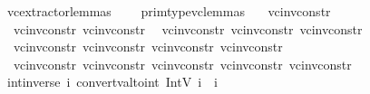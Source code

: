 \begin{isabellebody}
\isanewline
{}\isamarkupfalse%
\ vc{\isacharunderscore}{\kern0pt}extractor{\isacharunderscore}{\kern0pt}lemmas\ {\isacharequal}{\kern0pt}\ \isanewline
\ \ prim{\isacharunderscore}{\kern0pt}type{\isacharunderscore}{\kern0pt}vc{\isacharunderscore}{\kern0pt}lemmas\ \isanewline
\ \ vc{\isacharunderscore}{\kern0pt}inv{\isacharunderscore}{\kern0pt}constr{\isacharunderscore}{\kern0pt}{}{}\ \ \isanewline
\ \ vc{\isacharunderscore}{\kern0pt}inv{\isacharunderscore}{\kern0pt}constr{\isacharunderscore}{\kern0pt}{}{}\ vc{\isacharunderscore}{\kern0pt}inv{\isacharunderscore}{\kern0pt}constr{\isacharunderscore}{\kern0pt}{}{}\isanewline
\ \ vc{\isacharunderscore}{\kern0pt}inv{\isacharunderscore}{\kern0pt}constr{\isacharunderscore}{\kern0pt}{}{}\ vc{\isacharunderscore}{\kern0pt}inv{\isacharunderscore}{\kern0pt}constr{\isacharunderscore}{\kern0pt}{}{}\ vc{\isacharunderscore}{\kern0pt}inv{\isacharunderscore}{\kern0pt}constr{\isacharunderscore}{\kern0pt}{}{}\isanewline
\ \ vc{\isacharunderscore}{\kern0pt}inv{\isacharunderscore}{\kern0pt}constr{\isacharunderscore}{\kern0pt}{}{}\ vc{\isacharunderscore}{\kern0pt}inv{\isacharunderscore}{\kern0pt}constr{\isacharunderscore}{\kern0pt}{}{}\ vc{\isacharunderscore}{\kern0pt}inv{\isacharunderscore}{\kern0pt}constr{\isacharunderscore}{\kern0pt}{}{}\ vc{\isacharunderscore}{\kern0pt}inv{\isacharunderscore}{\kern0pt}constr{\isacharunderscore}{\kern0pt}{}{}\isanewline
\ \ vc{\isacharunderscore}{\kern0pt}inv{\isacharunderscore}{\kern0pt}constr{\isacharunderscore}{\kern0pt}{}{}\ vc{\isacharunderscore}{\kern0pt}inv{\isacharunderscore}{\kern0pt}constr{\isacharunderscore}{\kern0pt}{}{}\ vc{\isacharunderscore}{\kern0pt}inv{\isacharunderscore}{\kern0pt}constr{\isacharunderscore}{\kern0pt}{}{}\ vc{\isacharunderscore}{\kern0pt}inv{\isacharunderscore}{\kern0pt}constr{\isacharunderscore}{\kern0pt}{}{}\ vc{\isacharunderscore}{\kern0pt}inv{\isacharunderscore}{\kern0pt}constr{\isacharunderscore}{\kern0pt}{}{}\isanewline
\isanewline
\isanewline
{}\isamarkupfalse%
\ int{\isacharunderscore}{\kern0pt}inverse{\isacharunderscore}{\kern0pt}{}{\isacharcolon}{\kern0pt}{\isachardoublequoteopen}{\isasymforall}\ i{\isachardot}{\kern0pt}\ convert{\isacharunderscore}{\kern0pt}val{\isacharunderscore}{\kern0pt}to{\isacharunderscore}{\kern0pt}int\ {\isacharparenleft}{\kern0pt}IntV\ i{\isacharparenright}{\kern0pt}\ {\isacharequal}{\kern0pt}\ i{\isachardoublequoteclose}\isanewline

\end{isabellebody}
